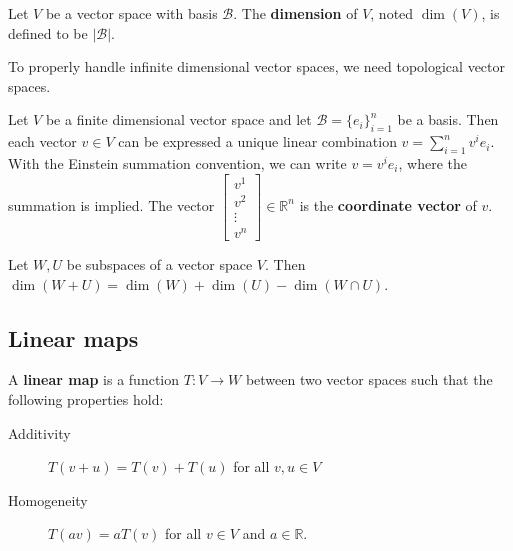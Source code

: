 \documentclass{bareminimum}
\begin{document}
	\begin{defn}[Dimension]
		Let $V$ be a vector space  with basis $\mathcal{B}$. The \textbf{dimension} of $V$, noted $\dim(V)$, is defined to be $|\mathcal{B}|$.
	\end{defn}
	
	\begin{remark}
		To properly handle infinite dimensional vector spaces, we need topological vector spaces.
	\end{remark}
	
	\begin{defn}
		Let $V$ be a finite dimensional vector space and let $\mathcal{B} = \{e_i\}_{i=1}^n$ be a basis. Then each vector $v \in V$ can be expressed a unique linear combination $v = \sum_{i=1}^n v^i e_i$. With the Einstein summation convention, we can write $v = v^i e_i$, where the summation is implied. The vector $\begin{bmatrix}
			v^1 \\ v^2 \\ \vdots \\ v^n
		\end{bmatrix} \in \mathbb{R}^n$ is the \textbf{coordinate vector} of $v$.
	\end{defn}
	
	\begin{prop}
		Let $W,U$ be subspaces of a vector space $V$. Then $\dim(W + U) = \dim(W) + \dim(U) - \dim(W \cap U)$.
	\end{prop}
	
\subsection{Linear maps}


\begin{defn}
	A \textbf{linear map}  is a function $T : V \to W$ between two vector spaces such that the following properties hold:
	\begin{description}
		\item[Additivity] $T(v + u) = T(v) + T(u)$ for all $v,u \in V$
		\item[Homogeneity] $T(av) = aT(v)$ for all $v \in V$ and $a \in \mathbb{R}$.
	\end{description}
\end{defn}
\end{document}
